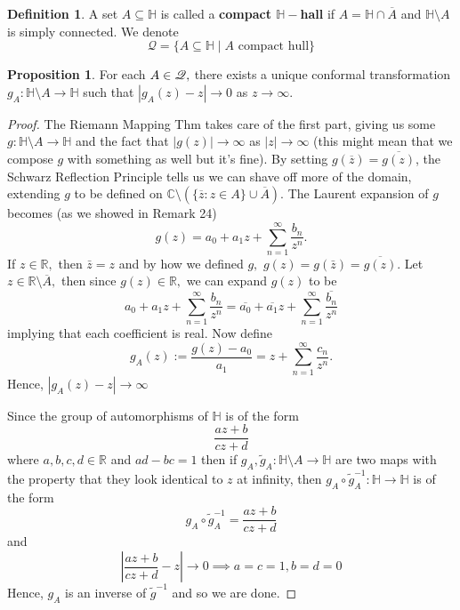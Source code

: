 \documentclass[10pt, oneside]{article}
\newcommand{\bbR}{\mathbb{R}}
\newcommand{\bbC}{\mathbb{C}}
\newcommand{\sm}{\setminus}
\theoremstyle{definition}
\newtheorem{defn}{Definition}
\newtheorem{prop}{Proposition}
\newcommand{\bbC}{\mathbb{C}}
\newcommand{\bbH}{\mathbb{H}}
\newcommand{\bbR}{\mathbb{R}}
\newcommand{\sm}{\setminus}
\begin{document}
\begin{defn}
    A set $A \subseteq \bbH$ is called a \textbf{compact $\bbH-$hall} if $A = \bbH \cap \overline{A}$ and $\bbH \sm A$ is simply connected. We denote 
    \[\mathcal{Q} = \{A \subseteq \bbH \mid A \text{ compact hull}\}\]
\end{defn}
\begin{prop}
    For each $A\in \cal Q,$ there exists a unique conformal transformation $g_A:\bbH \sm A \to \bbH$ such that $|g_A(z) - z|\to 0$ as $z\to \infty.$
\end{prop}
\begin{proof}
    The Riemann Mapping Thm takes care of the first part, giving us some $g: \bbH\sm A \to \bbH $ and the fact that $|g(z)|\to \infty $ as $|z|\to \infty$ (this might mean that we compose $g$ with something as well but it's fine). By setting $g(\overline{z}) =\overline{g(z)}$, the Schwarz Reflection Principle tells us we can shave off more of the domain, extending $g$ to be defined on $\bbC \sm (\{\overline{z} : z\in A\}\cup \overline{A}).$ The Laurent expansion of $g$ becomes (as we showed in Remark 24)
    \[g(z) = a_0 + a_1z + \sum_{n=1}^\infty \frac{b_n}{z^n}.\] If $z\in \bbR,$ then $\bar z = z$ and by how we defined $g,$ $g(z) = g(\bar z) = \overline{g(z)}.$ Let $z\in \bbR \sm \overline{A},$ then since $g(z) \in \bbR,$ we can expand $g(z)$ to be
    \[a_0 + a_1 z + \sum_{n=1}^\infty \frac{b_n}{z^n} = \overline{a_0} + \overline{a_1} z + \sum_{n=1}^\infty \frac{\overline{b_n}}{z^n} \] implying that each coefficient is real. Now define 
    \[g_A(z) := \frac{g(z) - a_0}{a_1} = z + \sum_{n=1}^\infty \frac{c_n}{z^n}.\] Hence, $|g_A(z) - z|\to \infty$

    Since the group of automorphisms of $\bbH$ is of the form 
    \[\frac{az + b}{cz + d}\] where $a,b,c,d \in \bbR$ and $ad - bc = 1$ then if $g_A, \tilde{g}_A: \bbH \sm A \to \bbH$ are two maps with the property that they look identical to $z$ at infinity, then $g_A \circ \tilde{g}^{-1}_A: \bbH \to \bbH$ is of the form 
    \[g_A \circ \tilde{g}^{-1}_A = \frac{az+b}{cz + d}\] and 
    \[\left| \frac{az+b}{cz + d} - z\right| \to 0 \implies a = c = 1, b = d = 0\] Hence, $g_A$ is an inverse of $\tilde{g}^{-1}$ and so we are done.
\end{proof}
\end{document}
